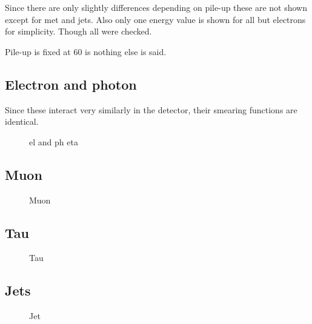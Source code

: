 Since there are only slightly differences depending on pile-up these are not shown except for met and jets. Also only one energy value is shown for all but electrons for simplicity. Though all were checked.

Pile-up is fixed at 60 is nothing else is said.
\subsection{Electron and photon}
Since these interact very  similarly in the detector, their smearing functions are identical.
 \begin{figure}[H] %
    \hfill
{}
    \hfill
    \hfill
{}
    \caption{el and ph eta}
    \label{fig:elph}
\end{figure}
\subsection{Muon}
 \begin{figure}[H] %
    \hfill
    \caption{Muon}
    \label{fig:muon}
  \end{figure}

\subsection{Tau}
 \begin{figure}[H] %
    \hfill
    \caption{Tau}
    \label{fig:tau}
  \end{figure}
\subsection{Jets}
 \begin{figure}[H] %
    \hfill
{}
    \hfill
    \hfill
{}
    \caption{Jet}
    \label{fig:jet}
\end{figure}

